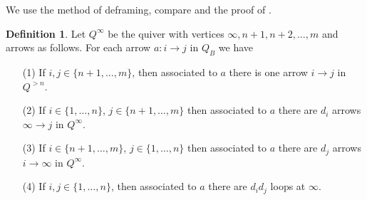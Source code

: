 \documentclass[11pt,a4paper]{amsart}
\theoremstyle{plain}
\theoremstyle{definition}
\newtheorem{dfn}[thm]{Definition}
\begin{document}
We use the method of deframing, compare 
\cite[\S 1]{CBmm} and the proof of \cite[Proposition 3.1]{CFR}. 

\begin{dfn} \label{deframed} Let $Q^{\infty}$ be the quiver with vertices $\infty , n+1, n+2, \ldots , m$ and arrows as follows. For  each arrow $a\colon i\to j$ in $Q_B$ we have 
\begin{itemize}
\item[(1)] If $i,j \in \{ n+1, \ldots ,m \}$, then associated to $a$ there is one arrow $i\to j$ in $Q^{>n}$. 

\item[(2)] If $i\in \{1, \ldots ,n\} $, $j \in \{ n+1, \ldots ,m \}$ then associated to $a$ there are $d_i$ arrows $\infty \to j$ in $Q^\infty $. 

\item[(3)] If $i \in \{ n+1, \ldots ,m \}$, $j\in \{1, \ldots , n\} $ then 
associated to $a$ there are $d_j$ arrows $i \to \infty $ in $Q^\infty $.

\item[(4)] If $i, j \in \{1, \ldots , n\}$, then associated to $a$ there are $d_id_j$ loops at $\infty$.   
\end{itemize}
\end{dfn}
\end{document}
